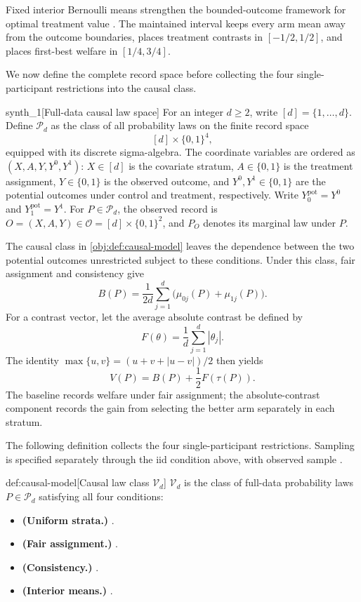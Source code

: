 \documentclass[11pt]{article}
\begin{document}
Fixed interior Bernoulli means strengthen the bounded-outcome framework for optimal treatment value \citep{LuedtkeVanDerLaan2016OptimalValue}. The maintained interval keeps every arm mean away from the outcome boundaries, places treatment contrasts in \([-1/2,1/2]\), and places first-best welfare in \([1/4,3/4]\).

We now define the complete record space before collecting the four single-participant restrictions into the causal class.

\begin{definitionv}{synth_1}[Full-data causal law space]
For an integer \(d\ge2\), write \([d]=\{1,\ldots,d\}\). Define \(\mathcal P_d\) as the class of all probability laws on the finite record space
\[
[d]\times\{0,1\}^4,
\]
equipped with its discrete sigma-algebra. The coordinate variables are ordered as \((X,A,Y,Y^0,Y^1)\): \(X\in[d]\) is the covariate stratum, \(A\in\{0,1\}\) is the treatment assignment, \(Y\in\{0,1\}\) is the observed outcome, and \(Y^0,Y^1\in\{0,1\}\) are the potential outcomes under control and treatment, respectively. Write \(Y^{\mathrm{pot}}_0=Y^0\) and \(Y^{\mathrm{pot}}_1=Y^1\). For \(P\in\mathcal P_d\), the observed record is \(O=(X,A,Y)\in\mathcal O=[d]\times\{0,1\}^2\), and \(P_O\) denotes its marginal law under \(P\).
\end{definitionv}

The causal class  in \cref{obj:def:causal-model} leaves the dependence between the two potential outcomes unrestricted subject to these conditions. Under this class, fair assignment and consistency give
\[
B(P)=\frac1{2d}\sum_{j=1}^d
\bigl(\mu_{0j}(P)+\mu_{1j}(P)\bigr).
\]
For a contrast vector, let the average absolute contrast  be defined by
\[
F(\theta)=\frac1d\sum_{j=1}^d|\theta_j|.
\]
The identity \(\max\{u,v\}=(u+v+|u-v|)/2\) then yields
\[
V(P)=B(P)+\frac12F(\tau(P)).
\]
The baseline records welfare under fair assignment; the absolute-contrast component records the gain from selecting the better arm separately in each stratum.

The following definition collects the four single-participant restrictions. Sampling is specified separately through the iid condition above, with observed sample .

\begin{definitionv}{def:causal-model}[Causal law class $\mathcal V_d$]
\(\mathcal V_d\) is the class of full-data probability laws \(P\in\mathcal P_d\) satisfying all four conditions:
\begin{itemize}
\item \textbf{(Uniform strata.)} .
\item \textbf{(Fair assignment.)} .
\item \textbf{(Consistency.)} .
\item \textbf{(Interior means.)} .
\end{itemize}
\end{definitionv}
\end{document}
